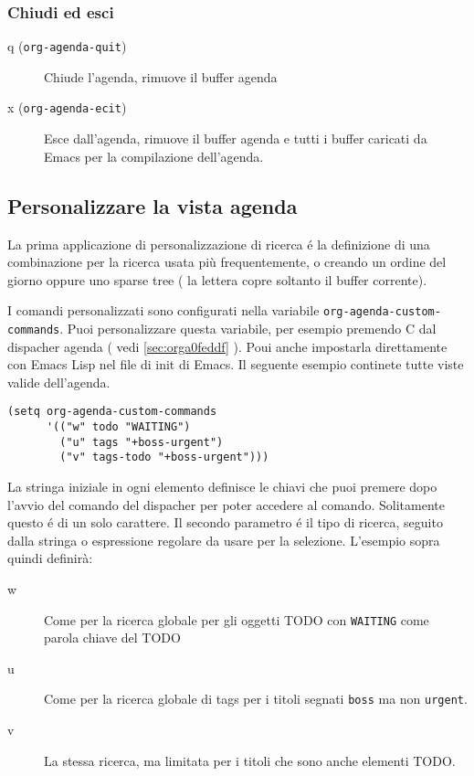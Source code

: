 \documentclass[11pt]{article}
\begin{document}
\subsubsection*{Chiudi ed esci}
\label{sec:org743c9e3}
\begin{description}
\item[{q (\texttt{org-agenda-quit})}] Chiude l'agenda, rimuove il buffer agenda

\item[{x (\texttt{org-agenda-ecit})}] Esce dall'agenda, rimuove il buffer agenda e tutti i buffer caricati
da Emacs per la compilazione dell'agenda.
\end{description}

\subsection{Personalizzare la vista agenda}
\label{sec:org9401c07}
La prima applicazione di personalizzazione di ricerca é la definizione
di una combinazione per la ricerca usata più frequentemente, o creando
un ordine del giorno oppure uno sparse tree ( la lettera copre soltanto
il buffer corrente).

I comandi personalizzati sono configurati nella variabile
\texttt{org-agenda-custom-commands}. Puoi personalizzare questa variabile,
per esempio premendo C dal dispacher agenda ( vedi \ref{sec:orga0feddf} ). Poui anche impostarla direttamente con Emacs
Lisp nel file di init di Emacs. Il seguente esempio continete tutte
viste valide dell'agenda.

\begin{verbatim}
(setq org-agenda-custom-commands
      '(("w" todo "WAITING")
        ("u" tags "+boss-urgent")
        ("v" tags-todo "+boss-urgent")))
\end{verbatim}

La stringa iniziale in ogni elemento definisce le chiavi che puoi
premere dopo l'avvio del comando del dispacher per poter accedere al
comando. Solitamente questo é di un solo carattere. Il secondo
parametro é il tipo di ricerca, seguito dalla stringa o espressione
regolare da usare per la selezione. L'esempio sopra quindi definirà:

\begin{description}
\item[{w}] Come per la ricerca globale per gli oggetti TODO con \texttt{WAITING} come
parola chiave del TODO

\item[{u}] Come per la ricerca globale di tags per i titoli segnati \texttt{boss} ma
non \texttt{urgent}.

\item[{v}] La stessa ricerca, ma limitata per i titoli che sono anche elementi
TODO.
\end{description}
\end{document}
